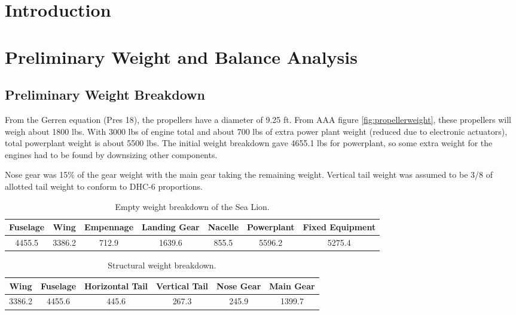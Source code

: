 \documentclass[conf]{new-aiaa}
\begin{document}
\section{Introduction}

\section{Preliminary Weight and Balance Analysis}

\subsection{Preliminary Weight Breakdown}

From the Gerren equation (Pres 18), the propellers have a diameter of 9.25 ft. From AAA figure \ref{fig:propellerweight}, these propellers will weigh about 1800 lbs. With 3000 lbs of engine total and about 700 lbs of extra power plant weight (reduced due to electronic actuators), total powerplant weight is about 5500 lbs. The initial weight breakdown gave 4655.1 lbs for powerplant, so some extra weight for the engines had to be found by downsizing other components.

Nose gear was 15\% of the gear weight with the main gear taking the remaining weight. Vertical tail weight was assumed to be 3/8 of allotted tail weight to conform to DHC-6 proportions.

\begin{table}[H]
\centering
\label{tab:Empty Weight}
\caption{Empty weight breakdown of the Sea Lion.}
\begin{tabular}{|c|c|c|c|c|c|c|}\hline
Fuselage & Wing & Empennage & Landing Gear & Nacelle & Powerplant & Fixed Equipment \\ \hline
4455.5 & 3386.2 & 712.9 & 1639.6 & 855.5 & 5596.2 & 5275.4 \\ \hline
\end{tabular}
\end{table}
\begin{table}[H]
\centering
\label{tab:Structural Weight}
\caption{Structural weight breakdown.}
\begin{tabular}{|c|c|c|c|c|c|}\hline
Wing & Fuselage & Horizontal Tail & Vertical Tail & Nose Gear & Main Gear \\ \hline
3386.2 & 4455.6 & 445.6 & 267.3 & 245.9 & 1399.7 \\ \hline
\end{tabular}
\end{table}
\end{document}

